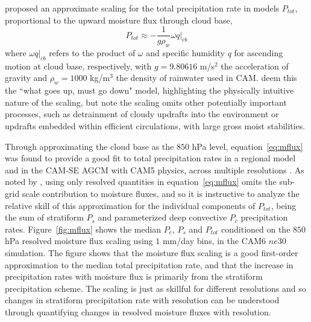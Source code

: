 \documentclass[times]{qjrms4}
\begin{document}
\cite{RETAL2016CD} proposed an approximate scaling for the total precipitation rate in models $P_{tot}$, proportional to the upward moisture flux through cloud base,
\begin{equation}
P_{tot} \approx -\frac{1}{g\rho_{w}} \omega q |_{cb} \label{eq:mflux}
\end{equation}
where $\omega q |_{cb}$ refers to the product of $\omega$ and specific humidity $q$ for ascending motion at cloud base, respectively, with $g=9.80616$ m/s$^2$ the acceleration of gravity and $\rho_w=1000$ kg/m$^3$ the density of rainwater used in CAM. \cite{OETAL2016JAMES} deem this the ``what goes up, must go down" model, highlighting the physically intuitive nature of the scaling, but note the scaling omits other potentially important processes, such as detrainment of cloudy updrafts into the environment or updrafts embedded within efficient circulations, with large gross moist stabilities.

Through approximating the cloud base as the $850$ hPa level, equation~\ref{eq:mflux} was found to provide a good fit to total precipitation rates in a regional model \citep{RETAL2016CD} and in the CAM-SE AGCM with CAM5 physics, across multiple resolutions \citep[recall that CAM-SE is different from CAM-SE-CSLAM, used in this study;][]{OETAL2016JAMES}. As noted by \cite{RETAL2016CD}, using only resolved quantities in equation~\ref{eq:mflux} omits the sub-grid scale contribution to moisture fluxes, and so it is instructive to analyze the relative skill of this approximation for the individual components of $P_{tot}$, being the sum of stratiform $P_s$ and parameterized deep convective $P_c$ precipitation rates. Figure~\ref{fig:mflux} shows the median $P_c$, $P_s$ and $P_{tot}$ conditioned on the $850$ hPa resolved moisture flux scaling using $1$ mm/day bins, in the CAM6 $ne30$ simulation. The figure shows that the moisture flux scaling is a good first-order approximation to the median total precipitation rate, and that the increase in precipitation rates with moisture flux is primarily from the stratiform precipitation scheme. The scaling is just as skillful for different resolutions \citep[not shown;][]{OETAL2016JAMES} and so changes in stratiform precipitation rate with resolution can be understood through quantifying changes in resolved moisture fluxes with resolution.
\end{document}
